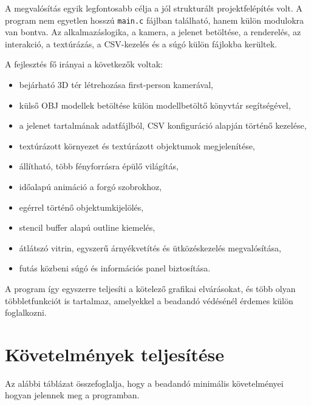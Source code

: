 \documentclass[12pt,a4paper]{article}
\newcommand{\code}[1]{\texttt{#1}}
\begin{document}
A megvalósítás egyik legfontosabb célja a jól strukturált projektfelépítés volt. A program nem egyetlen hosszú \code{main.c} fájlban található, hanem külön modulokra van bontva. Az alkalmazáslogika, a kamera, a jelenet betöltése, a renderelés, az interakció, a textúrázás, a CSV-kezelés és a súgó külön fájlokba kerültek.

A fejlesztés fő irányai a következők voltak:

\begin{itemize}
    \item bejárható 3D tér létrehozása first-person kamerával,
    \item külső OBJ modellek betöltése külön modellbetöltő könyvtár segítségével,
    \item a jelenet tartalmának adatfájlból, CSV konfiguráció alapján történő kezelése,
    \item textúrázott környezet és textúrázott objektumok megjelenítése,
    \item állítható, több fényforrásra épülő világítás,
    \item időalapú animáció a forgó szobrokhoz,
    \item egérrel történő objektumkijelölés,
    \item stencil buffer alapú outline kiemelés,
    \item átlátszó vitrin, egyszerű árnyékvetítés és ütközéskezelés megvalósítása,
    \item futás közbeni súgó és információs panel biztosítása.
\end{itemize}

A program így egyszerre teljesíti a kötelező grafikai elvárásokat, és több olyan többletfunkciót is tartalmaz, amelyekkel a beadandó védésénél érdemes külön foglalkozni.

\section{Követelmények teljesítése}

Az alábbi táblázat összefoglalja, hogy a beadandó minimális követelményei hogyan jelennek meg a programban.
\end{document}
